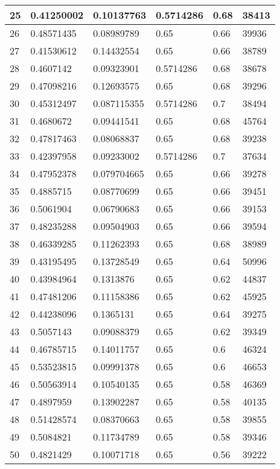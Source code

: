 \begin{longtable}{|l|l|l|l|l|l|}
25 & 0.41250002 & 0.10137763 & 0.5714286 & 0.68 & 38413 \\ \hline 
26 & 0.48571435 & 0.08989789 & 0.65 & 0.66 & 39936 \\ \hline 
27 & 0.41530612 & 0.14432554 & 0.65 & 0.66 & 38789 \\ \hline 
28 & 0.4607142 & 0.09323901 & 0.5714286 & 0.68 & 38678 \\ \hline 
29 & 0.47098216 & 0.12693575 & 0.65 & 0.68 & 39296 \\ \hline 
30 & 0.45312497 & 0.087115355 & 0.5714286 & 0.7 & 38494 \\ \hline 
31 & 0.4680672 & 0.09441541 & 0.65 & 0.68 & 45764 \\ \hline 
32 & 0.47817463 & 0.08068837 & 0.65 & 0.68 & 39238 \\ \hline 
33 & 0.42397958 & 0.09233002 & 0.5714286 & 0.7 & 37634 \\ \hline 
34 & 0.47952378 & 0.079704665 & 0.65 & 0.66 & 39278 \\ \hline 
35 & 0.4885715 & 0.08770699 & 0.65 & 0.66 & 39451 \\ \hline 
36 & 0.5061904 & 0.06790683 & 0.65 & 0.66 & 39153 \\ \hline 
37 & 0.48235288 & 0.09504903 & 0.65 & 0.66 & 39594 \\ \hline 
38 & 0.46339285 & 0.11262393 & 0.65 & 0.68 & 38989 \\ \hline 
39 & 0.43195495 & 0.13728549 & 0.65 & 0.64 & 50996 \\ \hline 
40 & 0.43984964 & 0.1313876 & 0.65 & 0.62 & 44837 \\ \hline 
41 & 0.47481206 & 0.11158386 & 0.65 & 0.62 & 45925 \\ \hline 
42 & 0.44238096 & 0.1365131 & 0.65 & 0.64 & 39275 \\ \hline 
43 & 0.5057143 & 0.09088379 & 0.65 & 0.62 & 39349 \\ \hline 
44 & 0.46785715 & 0.14011757 & 0.65 & 0.6 & 46324 \\ \hline 
45 & 0.53523815 & 0.09991378 & 0.65 & 0.6 & 46653 \\ \hline 
46 & 0.50563914 & 0.10540135 & 0.65 & 0.58 & 46369 \\ \hline 
47 & 0.4897959 & 0.13902287 & 0.65 & 0.58 & 40135 \\ \hline 
48 & 0.51428574 & 0.08370663 & 0.65 & 0.58 & 39855 \\ \hline 
49 & 0.5084821 & 0.11734789 & 0.65 & 0.58 & 39346 \\ \hline 
50 & 0.4821429 & 0.10071718 & 0.65 & 0.56 & 39222 \\ \hline 
\end{longtable}